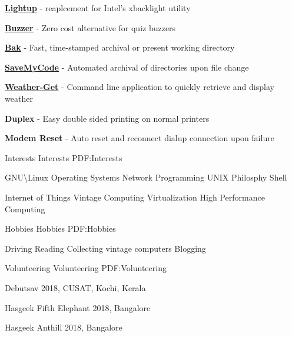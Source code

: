 \documentclass[letterpaper,MMMyyyy,nonstopmode]{simpleresumecv}
\begin{document}
\begin{Body}
\BigGap
\BulletItem
\href{https://github.com/karuvally/lightup}
{\textbf{Lightup}} - reaplcement for Intel's xbacklight utility
\hfill
{}

\BigGap
\BulletItem
\href{https://github.com/karuvally/buzzer}
{\textbf{Buzzer}} - Zero cost alternative for quiz buzzers
\hfill
{}

\BigGap
\BulletItem
\href{https://github.com/karuvally/bak}
{\textbf{Bak}} - Fast, time-stamped archival or present working directory
\hfill
{}

\BigGap
\BulletItem
\href{https://github.com/karuvally/SaveMyCode}
{\textbf{SaveMyCode}} - Automated archival of directories upon file change
\hfill
{}

\BigGap
\BulletItem
\href{https://github.com/karuvally/weather-get}
{\textbf{Weather-Get}} - Command line application to quickly retrieve and display
weather
\hfill
{}

\BigGap
\BulletItem
{\textbf{Duplex}} - Easy double sided printing on normal printers
\hfill
{}

\BigGap
\BulletItem
{\textbf{Modem Reset}} - Auto reset and reconnect dialup connection upon failure
\hfill
{}


\BigGap
\Section
{Interests}
{Interests}
{PDF:Interests}

\Entry
GNU\textbackslash Linux \textbullet{} Operating Systems \textbullet{}
Network Programming \textbullet{} UNIX Philosphy \textbullet{} Shell

\Gap
\Entry
Internet of Things \textbullet{} Vintage Computing \textbullet{}
Virtualization \textbullet{} High Performance Computing


\BigGap
\Section
{Hobbies}
{Hobbies}
{PDF:Hobbies}

\Entry
Driving \textbullet{} Reading \textbullet{} Collecting vintage computers
\textbullet{} Blogging


\BigGap
\Section
{Volunteering}
{Volunteering}
{PDF:Volunteering}

\BulletItem
Debutsav 2018, CUSAT, Kochi, Kerala

\BigGap
\BulletItem
Hasgeek Fifth Elephant 2018, Bangalore

\BigGap
\BulletItem
Hasgeek Anthill 2018, Bangalore 


\end{Body}
\end{document}
